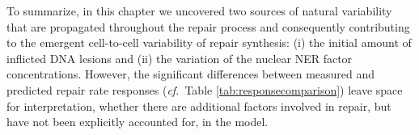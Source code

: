 To summarize, in this chapter we uncovered two sources of natural variability that are propagated throughout the repair process and consequently contributing to the emergent cell-to-cell variability of repair synthesis: (i) the initial amount of inflicted DNA lesions and (ii) the variation of the nuclear NER factor concentrations. 
However, the significant differences between measured and predicted repair rate responses (\textit{cf.}\ Table \ref{tab:responsecomparison}) leave space for interpretation, whether there are additional factors involved in repair, but have not been explicitly accounted for, in the model.

